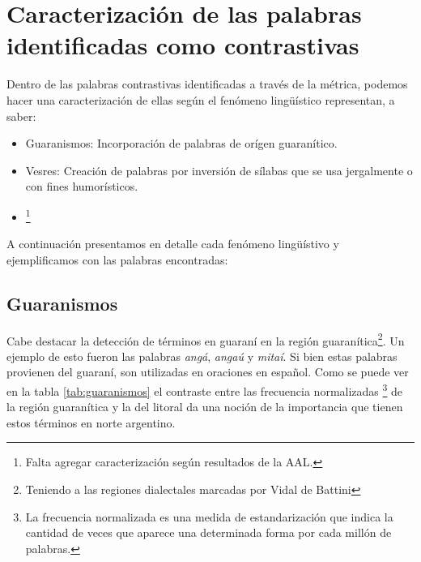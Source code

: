 
\section{Caracterización de las palabras identificadas como contrastivas}
\label{caracterizacion_resultados}

Dentro de las palabras contrastivas identificadas a través de la métrica, podemos hacer una caracterización de ellas según el fenómeno lingüístico representan, a saber:

\begin{itemize}
  \item Guaranismos: Incorporación de palabras de orígen guaranítico.
  \item Vesres: Creación de palabras por inversión de sílabas que se usa jergalmente o con fines humorísticos.
  \item \footnote{Falta agregar caracterización según resultados de la AAL.}
\end{itemize}

A continuación presentamos en detalle cada fenómeno lingüístivo y ejemplificamos con las palabras encontradas:

\subsection{Guaranismos}
\label{sub:guaranismos}
Cabe destacar la detección de términos en guaraní en la región  guaranítica\footnote{Teniendo a las regiones dialectales marcadas por Vidal de Battini}.
Un ejemplo de esto fueron las palabras \textit{angá}, \textit{angaú} y \textit{mitaí}.  Si bien estas palabras provienen del guaraní, son utilizadas en oraciones en español.
Como se puede ver en la tabla \ref{tab:guaranismos} el contraste entre las frecuencia normalizadas \footnote{La frecuencia normalizada es una medida de estandarización que indica la cantidad de veces que aparece una determinada forma por cada millón de palabras.} de la región guaranítica y la del litoral da una noción de la importancia que tienen estos términos en norte argentino. 

